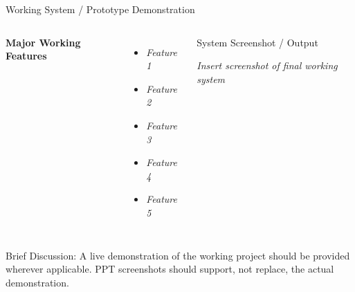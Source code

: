 \documentclass[aspectratio=169,11pt]{beamer}
\newcommand{\smallnote}[1]{%
\vspace{0.08cm}
{\scriptsize\color{GEUGrey}#1}
}
\newcommand{\placeholder}[1]{%
\textit{\color{GEUGrey}#1}
}
\begin{document}
\begin{frame}{Working System / Prototype Demonstration}

\begin{columns}[T,totalwidth=\textwidth]


\textbf{\color{GEUBlue}Major Working Features}

\begin{itemize}\itemsep3pt
    \item \placeholder{Feature 1}
    \item \placeholder{Feature 2}
    \item \placeholder{Feature 3}
    \item \placeholder{Feature 4}
    \item \placeholder{Feature 5}
\end{itemize}


\begin{block}{System Screenshot / Output}

\centering
\vspace{11mm}

\placeholder{
Insert screenshot of final working system
}

\vspace{11mm}

\end{block}

\end{columns}

\vfill

\smallnote{
Brief Discussion: A live demonstration of the working project should
be provided wherever applicable. PPT screenshots should support,
not replace, the actual demonstration.
}

\end{frame}
\end{document}
